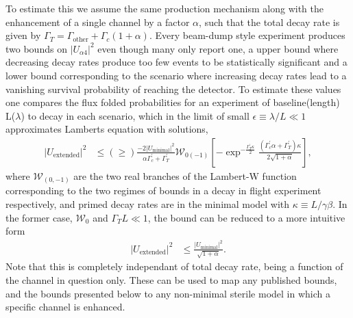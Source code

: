 \documentclass[11pt, a4paper]{article}
\begin{document}
To estimate this we assume the same production mechanism along with the
enhancement of a single channel by a factor $\alpha$, such that the total decay
rate is given by $\Gamma_T = \Gamma_\text{other}+\Gamma_c (1+\alpha)$. Every
beam-dump style experiment produces two bounds on $|U_{\alpha 4}|^2$ even
though many only report one, a upper bound where decreasing decay rates produce
too few events to be statistically significant and a lower bound corresponding
to the scenario where increasing decay rates lead to a vanishing survival
probability of reaching the detector. To estimate these values one compares the
flux folded probabilities for an experiment of baseline(length) L($\lambda$) to
decay in each scenario, which in the limit of small $\epsilon \equiv \lambda/L
\ll 1$ approximates Lamberts equation with solutions, \begin{align*}
|U_\text{extended}|^2 &\leq (\geq) \frac{-2 |U_\text{minimal}|^2}{\alpha
\Gamma^\prime_c +\Gamma^\prime_T}
\mathcal{W}_{0(-1)}\left[-\exp^{-\frac{\Gamma^\prime_T \kappa}{2}}
\frac{(\Gamma^\prime_c \alpha + \Gamma^\prime_T)\kappa}{2\sqrt{1+\alpha}}
\right], \end{align*} where $\mathcal{W}_{(0,-1)}$ are the two real branches of
the Lambert-W function corresponding to the two regimes of bounds in a decay in
flight experiment respectively, and primed decay rates are in the minimal model
with $\kappa \equiv L/\gamma \beta$. In the former case, $\mathcal{W}_0$ and
$\Gamma_T L \ll 1$, the bound can be reduced to a more intuitive form
\begin{align*} |U_\text{extended}|^2 &\leq
\frac{|U_{\text{minimal}}|^2}{\sqrt{1+\alpha}}.  \end{align*} Note that this is
completely independant of total decay rate, being a function of the channel in
question only.  These can be used to map any published bounds, and the bounds
presented below to any non-minimal sterile model in which a specific channel is
enhanced.\\
\end{document}
